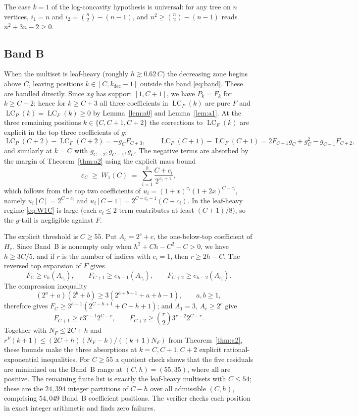 \documentclass[11pt]{article}
\theoremstyle{definition}
\newcommand{\eps}{\varepsilon}
\DeclareMathOperator{\lc}{LC}
\begin{document}
The case $k=1$ of the log-concavity hypothesis is universal: for any
tree on $n$ vertices, $i_1=n$ and $i_2=\binom n2-(n-1)$, and
$n^2\ge\binom n2-(n-1)$ reads $n^2+3n-2\ge0$.

\subsection{Band B}\label{sec:bandB}

When the multiset is leaf-heavy (roughly $h\gtrsim 0.62\,C$) the
decreasing zone begins above $C$, leaving positions
$k\in[C,k_{\mathrm{dec}}-1]$ outside the band \eqref{eq:band}.  These
are handled directly.  Since $xg$ has support $[1,C+1]$, we have
$P_k=F_k$ for $k\ge C+2$; hence for $k\ge C+3$ all three coefficients
in $\lc_P(k)$ are pure $F$ and $\lc_P(k)=\lc_F(k)\ge0$ by
Lemma~\ref{lem:a0} and Lemma~\ref{lem:a1}.  At the three remaining
positions $k\in\{C,C+1,C+2\}$ the corrections to $\lc_F(k)$ are
explicit in the top three coefficients of $g$:
\[
  \lc_P(C{+}2)-\lc_F(C{+}2)=-g_CF_{C+3},\qquad
  \lc_P(C{+}1)-\lc_F(C{+}1)=2F_{C+1}g_C+g_C^2-g_{C-1}F_{C+2},
\]
and similarly at $k=C$ with $g_{C-2},g_{C-1},g_C$.  The negative
terms are absorbed by the margin of Theorem~\ref{thm:a2} using the
explicit mass bound
\begin{equation}\label{eq:W1C}
  \eps_C\;\ge\;W_1(C)\;=\;\sum_{i=1}^h\frac{C+c_i}{2^{\,c_i+1}},
\end{equation}
which follows from the top two coefficients of
$u_i=(1+x)^{c_i}(1+2x)^{C-c_i}$, namely $u_i[C]=2^{C-c_i}$ and
$u_i[C-1]=2^{C-c_i-1}(C+c_i)$.  In the leaf-heavy regime
\eqref{eq:W1C} is large (each $c_i\le2$ term contributes at least
$(C+1)/8$), so the $g$-tail is negligible against $F$.

The explicit threshold is $C\ge55$.  Put $A_c=2^c+c$, the
one-below-top coefficient of $H_c$.  Since Band~B is nonempty only
when $h^2+Ch-C^2-C>0$, we have $h\ge3C/5$, and if $r$ is the number
of indices with $c_i=1$, then $r\ge2h-C$.  The reversed top expansion
of $F$ gives
\[
  F_C\ge e_h(A_{c_i}),\qquad
  F_{C+1}\ge e_{h-1}(A_{c_i}),\qquad
  F_{C+2}\ge e_{h-2}(A_{c_i}).
\]
The compression inequality
\[
  (2^a+a)(2^b+b)\ge 3(2^{a+b-1}+a+b-1),\qquad a,b\ge1,
\]
therefore gives
$F_C\ge 3^{h-1}(2^{C-h+1}+C-h+1)$; and $A_1=3$, $A_c\ge2^c$ give
\[
  F_{C+1}\ge r3^{r-1}2^{C-r},\qquad
  F_{C+2}\ge \binom r2 3^{r-2}2^{C-r}.
\]
Together with $N_F\le2C+h$ and
$r^F(k{+}1)\le(2C+h)(N_F-k)/((k{+}1)N_F)$ from
Theorem~\ref{thm:a2}, these bounds make the three absorptions at
$k=C,C+1,C+2$ explicit rational-exponential inequalities.  For
$C\ge55$ a quotient check shows that the five residuals are minimized
on the Band~B range at $(C,h)=(55,35)$, where all are positive.  The
remaining finite list is exactly the leaf-heavy multisets with
$C\le54$; these
are the $24{,}394$ integer partitions of $C-h$ over all admissible
$(C,h)$, comprising $54{,}049$ Band~B coefficient positions.  The
verifier checks each position in exact integer arithmetic and finds
zero failures.
\end{document}
